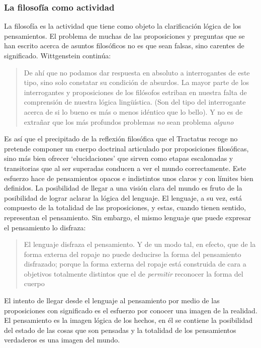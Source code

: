 \subsubsection{La filosofía como actividad}

La filosofía es la actividad que tiene como objeto la clarificación lógica de los pensamientos\autocite[\S4.112]{wittgenstein1922tractatuses}. El problema de muchas de las proposiciones y preguntas que se han escrito acerca de asuntos filosóficos no es que sean falsas, sino carentes de significado. Wittgenstein continúa: \blockquote[{\cite[\S4.003]{wittgenstein1922tractatuses}}]{De ahí que no podamos dar respuesta en absoluto a interrogantes de este tipo, sino solo constatar su condición de absurdos. La mayor parte de los interrogantes y proposiciones de los filósofos estriban en nuestra falta de comprensión de nuestra lógica lingüística. (Son del tipo del interrogante acerca de si lo bueno es más o menos idéntico que lo bello). Y no es de extrañar que los más profundos problemas \emph{no} sean problema \emph{alguno}}. Es así que el precipitado de la reflexión filosófica que el Tractatus recoge no pretende componer un cuerpo doctrinal articulado por proposiciones filosóficas, sino más bien ofrecer `elucidaciones' que sirven como etapas escalonadas y transitorias que al ser superadas conducen a ver el mundo correctamente. Este esfuerzo hace de pensamientos opacos e indistintos unos claros y con límites bien definidos\autocite[Cf.~][\S4.112 y \S6.54]{wittgenstein1922tractatuses}. La posibilidad de llegar a una visión clara del mundo es fruto de la posibilidad de lograr aclarar la lógica del lenguaje. El lenguaje, a su vez, está compuesto de la totalidad de las proposiciones, y estas, cuando tienen sentido, representan el pensamiento\autocite[Cf.~][\S4 y \S4.001]{wittgenstein1922tractatuses}. Sin embargo, el mismo lenguaje que puede expresar el pensamiento lo disfraza: \blockquote[{\cite[\S4.002]{wittgenstein1922tractatuses}}]{El lenguaje disfraza el pensamiento. Y de un modo tal, en efecto, que de la forma externa del ropaje no puede deducirse la forma del pensamiento disfrazado; porque la forma externa del ropaje está construida de cara a objetivos totalmente distintos que el de \emph{permitir} reconocer la forma del cuerpo}.

El intento de llegar desde el lenguaje al pensamiento por medio de las proposiciones con significado es el esfuerzo por conocer una imagen de la realidad. El pensamiento es la imagen lógica de los hechos, en él se contiene la posibilidad del estado de las cosas que son pensadas y la totalidad de los pensamientos verdaderos es una imagen del mundo\autocite[Cf.~][\S3 y \S3.001]{wittgenstein1922tractatuses}.

